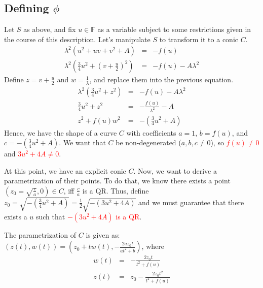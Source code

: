 \documentclass[letterpaper,11pt]{article}
\begin{document}
\subsection{Defining $\phi$}
Let $S$ as above, and fix $u\in\mathbb{F}$ as a variable subject to some restrictions given in the course of this description.
Let's manipulate $S$ to transform it to a conic $C$.
\begin{eqnarray*}
\lambda^2(u^2+uv+v^2+A) &=& -f(u) \\
 \lambda^2\left( \frac{3}{4}u^2 + \left(v+\frac{u}{2}\right)^2 \right) &=& -f(u)-A\lambda^2
\end{eqnarray*}
Define $z=v+\frac{u}{2}$ and $w=\frac{1}{\lambda}$, and replace them into the previous equation.
\begin{eqnarray*}
 \lambda^2\left(\frac{3}{4}u^2 + z^2\right)  &=& -f(u)-A\lambda^2 \\
 \frac{3}{4}u^2 + z^2  &=& -\frac{f(u)}{\lambda^2}-A \\
  z^2 + f(u) w^ 2  &=& -\left(\tfrac{3}{4}u^2+A\right)
\end{eqnarray*}
Hence, we have the shape of a curve $C$ with coefficients $a=1$, $b=f(u)$, and $c=-\left(\tfrac{3}{4}u^2+A\right)$. We want that $C$ be non-degenerated ($a,b,c\neq 0$), so \textcolor{red}{$f(u)\neq 0$} and \textcolor{red}{$3u^2+4A \neq 0$}.

At this point, we have an explicit conic $C$. Now, we want to derive a parametrization of their points. To do that, we know there exists a point $(z_0=\sqrt{\frac{c}{a}},0)\in C$, iff $\frac{c}{a}$ is a QR. Thus, define $z_0=\sqrt{-\left(\tfrac{3}{4}u^2+A\right)} =\tfrac{1}{2}\sqrt{-(3u^2+4A)}$ and we must guarantee that there exists a $u$ such that \textcolor{red}{$-(3u^2+4A)$ is a QR}.

The parametrization of $C$ is given as: $(z(t),w(t)) = \left( z_0+tw(t),-\frac{2az_0t}{at^2+b} \right)$, where
\begin{eqnarray*}
 w(t) &=& -\frac{2z_0t}{t^2+f(u)}\\
 z(t) &=& z_0-\frac{2z_0t^2}{t^2+f(u)}
\end{eqnarray*}
\end{document}
